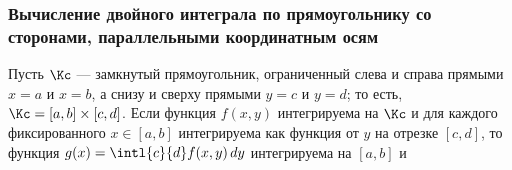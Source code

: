 \documentclass[a4paper]{article}
\begin{document}
\subsubsection{Вычисление двойного интеграла по прямоугольнику со
сторонами, параллельными координатным осям}

\begin{theorem}
\label{thm511} Пусть $\Kc$ --- замкнутый прямоугольник, ограниченный
слева и справа прямыми $x=a$ и $x=b$, а снизу и сверху прямыми $y=c$
и $y=d$; то есть, $\Kc=[a,b]\times[c,d]$. Если функция $f(x,y)$
интегрируема на $\Kc$ и для каждого фиксированного $x\in[a,b]$
интегрируема как функция от $y$ на отрезке $[c,d]$, то функция
$g(x)=\intl{c}{d} f(x,y)\,dy$ интегрируема на $[a,b]$ и
\end{theorem}

\end{document}
